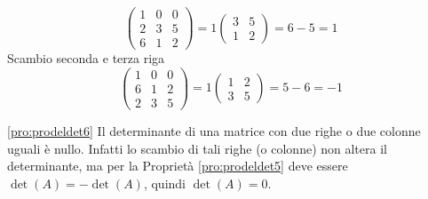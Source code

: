 \begin{es}
  \label{es:prodeldet5}
  \begin{equation*}
    \begin{pmatrix}
      1 & 0 & 0\\
      2 & 3 & 5\\
      6 & 1 & 2
    \end{pmatrix}=1
    \begin{pmatrix}
      3 & 5\\
      1 & 2
    \end{pmatrix}= 6-5=1
  \end{equation*}
  Scambio seconda e terza riga
  \begin{equation*}
    \begin{pmatrix}
      1 & 0 & 0 \\
      6 & 1 & 2 \\
      2 & 3 & 5
    \end{pmatrix}=1
    \begin{pmatrix}
      1 & 2\\
      3 & 5
    \end{pmatrix}=5-6=-1
  \end{equation*}
\end{es}
\begin{pro}
  \ref{pro:prodeldet6}
  Il determinante di una matrice con due righe o due colonne uguali
  è nullo. Infatti lo scambio di tali righe (o colonne) non altera il
  determinante, ma per la Proprietà \ref{pro:prodeldet5} deve essere
  $\det (A)=-\det(A)$, quindi $\det(A)=0$.
\end{pro}
